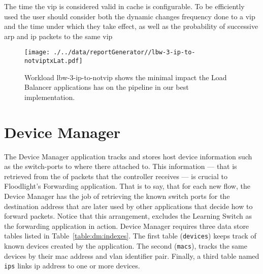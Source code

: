 \documentclass[12pt,openright,twoside]{report}
\begin{document}
The time the \gls{vip} is considered valid in cache is
configurable. To be efficiently used the user should consider both the
dynamic changes frequency done to a \gls{vip} and the time under which
they take effect, as well as the probability of successive arp and ip
packets to the same \gls{vip}


\begin{figure}[ht]
\centering
\texttt{[image: ./../data/reportGenerator//lbw-3-ip-to-notviptxLat.pdf]}
\caption[Minimum impact of Load Balancer in the pipeline.]{Workload
  lbw-3-ip-to-notvip shows the minimal impact the Load Balancer
  applications has on the pipeline in our best implementation.}
\end{figure}

\section{Device Manager}
\label{sec:feasibility:dm}
\glsresetall

The Device Manager application tracks and stores host device information such as the switch-ports to where there attached to. 
This information --- that is retrieved from the \gls{of} packets that the controller receives --- is crucial to Floodlight’s Forwarding application. That is to say, that for each new flow, the Device Manager has the job of retrieving the known switch ports for the destination address that are later used by other applications that decide how to forward packets. 
Notice that this arrangement, excludes the Learning Switch as the  forwarding application in action.
Device Manager requires three data store tables listed in Table~\ref{table:dm:indexes}.
The first table (\texttt{devices}) keeps track of known devices created by the application.
The second (\texttt{macs}),  tracks the same devices by their \gls{mac} address and \gls{vlan} identifier pair.
Finally, a third table named \texttt{ips} links  \gls{ip} address to one or more devices.
\end{document}
